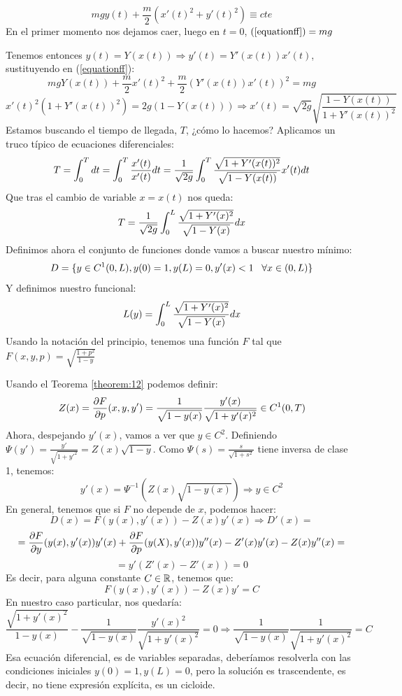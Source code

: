 \begin{equation}
\label{equationff}
mgy(t)+\frac{m}{2}(x'(t)^2+y'(t)^2)\equiv cte
\end{equation}
En el primer momento nos dejamos caer, luego en $t=0$, $(\ref{equationff})=mg$

Tenemos entonces $y(t)=Y(x(t)) \Rightarrow y'(t)=Y'(x(t))x'(t)$, sustituyendo en (\ref{equationff}):
\[
mgY(x(t))+\frac{m}{2}x'(t)^2+\frac{m}{2}(Y'(x(t))x'(t))^2=mg
\]
\[
x'(t)^2\left(1+Y'(x(t))^2\right)=2g\left(1-Y(x(t))\right)\Rightarrow x'(t)=\sqrt{2g}\sqrt{\frac{1-Y(x(t))}{1+Y'(x(t))^2}}
\]
Estamos buscando el tiempo de llegada, $T$, ¿cómo lo hacemos? Aplicamos un truco típico de ecuaciones diferenciales:
\[
T = \displaystyle\int_{ 0 }^{ T } dt=\displaystyle\int_{ 0 }^{ T } \frac{x'(t)}{x'(t)}dt=
\frac{1}{\sqrt{2g}}\displaystyle\int_{ 0 }^{ T } \frac{\sqrt{1+Y'(x(t))^2}}{\sqrt{1-Y(x(t))}}x'(t)dt
\]
Que tras el cambio de variable $x=x(t)$ nos queda:
\[
T=\frac{1}{\sqrt{2g}}\displaystyle\int_{ 0 }^{ L } \frac{\sqrt{1+Y'(x)^2}}{\sqrt{1-Y(x)}}dx
\]
Definimos ahora el conjunto de funciones donde vamos a buscar nuestro mínimo:
\[
D=\{y\in C^1(0,L),y(0)=1,y(L)=0, y'(x)<1 \;\;\; \forall x \in(0,L)\}
\]
Y definimos nuestro funcional:
\[
L(y)=\displaystyle\int_{ 0 }^{ L } \frac{\sqrt{1+Y'(x)^2}}{\sqrt{1-Y(x)}}dx
\]
Usando la notación del principio, tenemos una función $F$ tal que $F(x,y,p)=\sqrt{\frac{1+p^2}{1-y}}$

Usando el Teorema \ref{theorem:12} podemos definir:
\[
Z(x)=\frac{\partial F }{\partial p }(x,y,y')=\frac{1}{\sqrt{1-y(x)}}\frac{y'(x)}{\sqrt{1+y'(x)^2}} \in C^1(0,T)
\]
Ahora, despejando $y'(x)$, vamos a ver que $y\in C^2$. Definiendo $\Psi(y')=\frac{y'}{\sqrt{1+y'^2}}=Z(x)\sqrt{1-y}$. Como $\Psi(s)=\frac{s}{\sqrt{1+s^2}}$ tiene inversa de clase 1, tenemos:
\[
y'(x)=\Psi^{-1}(Z(x)\sqrt{1-y(x)})\Rightarrow y\in C^2
\]
En general, tenemos que si $F$ no depende de $x$, podemos hacer:
\[D(x)=F(y(x),y'(x))-Z(x)y'(x)\Rightarrow D'(x)=
\]
\[=\frac{\partial F }{\partial y }(y(x),y'(x))y'(x)+\frac{\partial F }{\partial p }(y(X),y'(x))y''(x)-Z'(x)y'(x)-Z(x)y''(x)=\]
\[
=y'(Z'(x)-Z'(x))=0
\]
Es decir, para alguna constante $C\in\mathbb{R}$, tenemos que:
\[
F(y(x),y'(x))-Z(x)y'=C
\]
En nuestro caso particular, nos quedaría:
\[
\frac{\sqrt{1+y'(x)^2}}{1-y(x)}-\frac{1}{\sqrt{1-y(x)}}\frac{y'(x)^2}{\sqrt{1+y'(x)^2}}=0 \Rightarrow \frac{1}{\sqrt{1-y(x)}}\frac{1}{\sqrt{1+y'(x)^2}}=C
\]
Esa ecuación diferencial, es de variables separadas, deberíamos resolverla con las condiciones iniciales $y(0)=1,y(L)=0$, pero la solución es trascendente, es decir, no tiene expresión explícita, es un cicloide.

